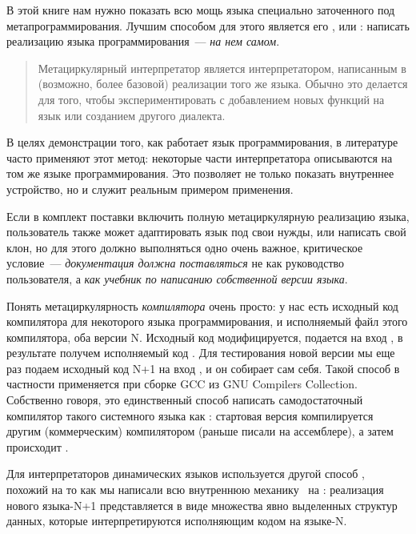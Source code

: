 \label{circ}\secdown

В этой книге нам нужно показать всю мощь языка специально заточенного под
метапрограммирования. Лучшим способом для этого является его ,
или : написать  реализацию языка
программирования\ --- \emph{на нем самом}.


\begin{quotation}
Метациркулярный интерпретатор является интерпретатором, написанным в (возможно,
более базовой) реализации того же языка. Обычно это делается для того, чтобы
экспериментировать с добавлением новых функций на язык или созданием другого
диалекта.
\end{quotation}

В целях демонстрации того, как работает язык программирования, в литературе
часто применяют этот метод: некоторые части интерпретатора описываются на том же
языке программирования. Это позволяет не только показать внутреннее устройство,
но и служит реальным примером применения.

Если в комплект поставки включить полную метациркулярную реализацию языка,
пользователь также может адаптировать язык под свои нужды, или написать свой
клон, но для этого должно выполняться одно очень важное, критическое условие\
--- \emph{документация должна поставляться} не как руководство
пользователя, а \emph{как учебник по написанию собственной версии языка}.

\bigskip
Понять метациркулярность \textit{компилятора} очень просто: у нас есть исходный
код компилятора для некоторого языка программирования, и исполняемый файл этого
компилятора, оба версии N. Исходный код модифицируется, подается на вход
\file{компилятора-N}, в результате получем исполняемый код
. Для тестирования новой версии мы еще раз подаем исходный
код N+1 на вход \file{компилятора-N+1}, и он собирает сам себя. Такой способ в
частности применяется при сборке GCC из GNU Compilers Collection.
Собственно говоря, это единственный способ написать самодостаточный компилятор
такого системного языка как \emc: стартовая версия компилируется другим
(коммерческим) компилятором (раньше писали на ассемблере), а затем
происходит \term{раскрутка компилятора}.

\clearpage
Для интерпретаторов динамических языков используется другой способ \cite{plai},
похожий на то как мы написали всю внутреннюю механику \hico\ на \py:
реализация нового языка-N+1 представляется в виде множества явно выделенных
структур данных, которые интерпретируются исполняющим кодом на языке-N.

